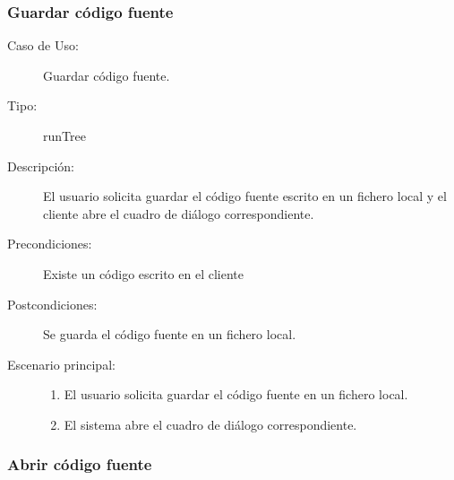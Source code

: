 \subsubsection{Guardar código fuente} 

\begin{description}
   \item[Caso de Uso:] Guardar código fuente.
   \item [Tipo:] runTree
   \item[Descripción:] 
   El usuario solicita guardar el código fuente escrito en un fichero local y el cliente
   abre el cuadro de diálogo correspondiente.
   \item[Precondiciones:]
   Existe un código escrito en el cliente 
   \item[Postcondiciones:] 
   Se guarda el código fuente en un fichero local.
   \item[Escenario principal:] \hfill
   \begin{enumerate}
   \item El usuario solicita guardar el código fuente en un fichero local.
   \item El sistema abre el cuadro de diálogo correspondiente.
   \end{enumerate}
\end{description}


\subsubsection{Abrir código fuente} 

